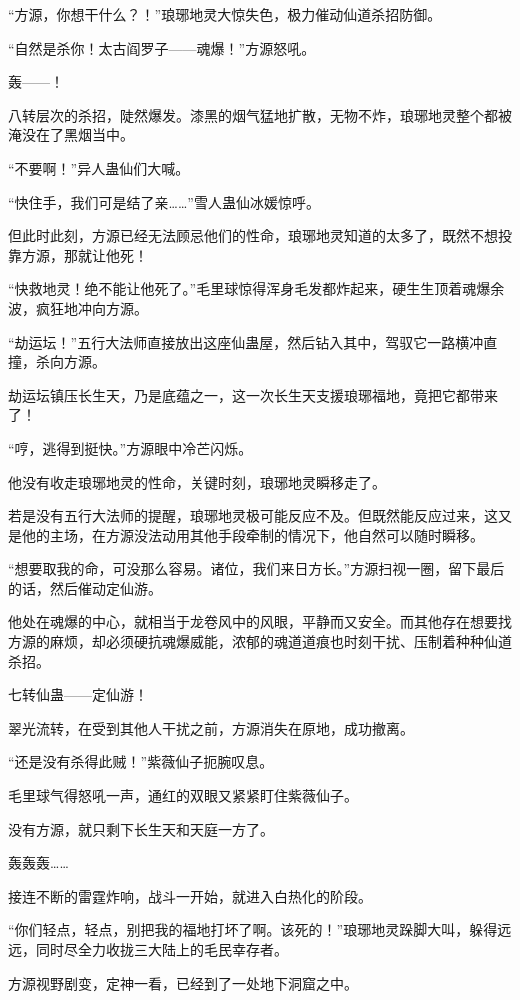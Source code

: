 \begin{this_body}
“方源，你想干什么？！”琅琊地灵大惊失色，极力催动仙道杀招防御。

“自然是杀你！太古阎罗子——魂爆！”方源怒吼。

轰——！

八转层次的杀招，陡然爆发。漆黑的烟气猛地扩散，无物不炸，琅琊地灵整个都被淹没在了黑烟当中。

“不要啊！”异人蛊仙们大喊。

“快住手，我们可是结了亲……”雪人蛊仙冰媛惊呼。

但此时此刻，方源已经无法顾忌他们的性命，琅琊地灵知道的太多了，既然不想投靠方源，那就让他死！

“快救地灵！绝不能让他死了。”毛里球惊得浑身毛发都炸起来，硬生生顶着魂爆余波，疯狂地冲向方源。

“劫运坛！”五行大法师直接放出这座仙蛊屋，然后钻入其中，驾驭它一路横冲直撞，杀向方源。

劫运坛镇压长生天，乃是底蕴之一，这一次长生天支援琅琊福地，竟把它都带来了！

“哼，逃得到挺快。”方源眼中冷芒闪烁。

他没有收走琅琊地灵的性命，关键时刻，琅琊地灵瞬移走了。

若是没有五行大法师的提醒，琅琊地灵极可能反应不及。但既然能反应过来，这又是他的主场，在方源没法动用其他手段牵制的情况下，他自然可以随时瞬移。

“想要取我的命，可没那么容易。诸位，我们来日方长。”方源扫视一圈，留下最后的话，然后催动定仙游。

他处在魂爆的中心，就相当于龙卷风中的风眼，平静而又安全。而其他存在想要找方源的麻烦，却必须硬抗魂爆威能，浓郁的魂道道痕也时刻干扰、压制着种种仙道杀招。

七转仙蛊——定仙游！

翠光流转，在受到其他人干扰之前，方源消失在原地，成功撤离。

“还是没有杀得此贼！”紫薇仙子扼腕叹息。

毛里球气得怒吼一声，通红的双眼又紧紧盯住紫薇仙子。

没有方源，就只剩下长生天和天庭一方了。

轰轰轰……

接连不断的雷霆炸响，战斗一开始，就进入白热化的阶段。

“你们轻点，轻点，别把我的福地打坏了啊。该死的！”琅琊地灵跺脚大叫，躲得远远，同时尽全力收拢三大陆上的毛民幸存者。

方源视野剧变，定神一看，已经到了一处地下洞窟之中。


\end{this_body}
